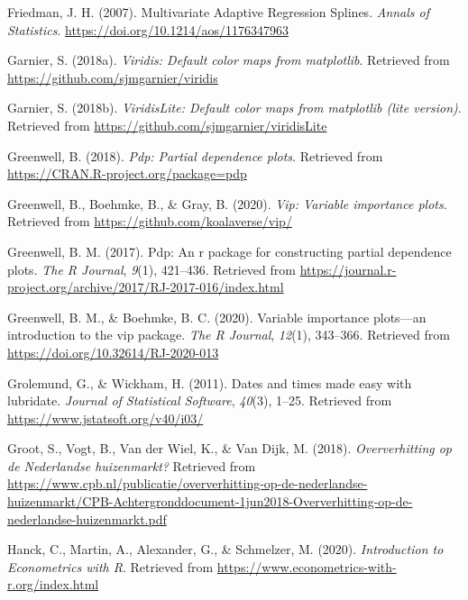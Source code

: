 \documentclass[
]{article}
\begin{document}
\leavevmode\hypertarget{ref-Friedman2007}{}%
Friedman, J. H. (2007). Multivariate Adaptive Regression Splines.
\emph{Annals of Statistics}.
\url{https://doi.org/10.1214/aos/1176347963}

\leavevmode\hypertarget{ref-R-viridis}{}%
Garnier, S. (2018a). \emph{Viridis: Default color maps from matplotlib}.
Retrieved from \url{https://github.com/sjmgarnier/viridis}

\leavevmode\hypertarget{ref-R-viridisLite}{}%
Garnier, S. (2018b). \emph{ViridisLite: Default color maps from
matplotlib (lite version)}. Retrieved from
\url{https://github.com/sjmgarnier/viridisLite}

\leavevmode\hypertarget{ref-R-pdp}{}%
Greenwell, B. (2018). \emph{Pdp: Partial dependence plots}. Retrieved
from \url{https://CRAN.R-project.org/package=pdp}

\leavevmode\hypertarget{ref-R-vip}{}%
Greenwell, B., Boehmke, B., \& Gray, B. (2020). \emph{Vip: Variable
importance plots}. Retrieved from
\url{https://github.com/koalaverse/vip/}

\leavevmode\hypertarget{ref-pdp2017}{}%
Greenwell, B. M. (2017). Pdp: An r package for constructing partial
dependence plots. \emph{The R Journal}, \emph{9}(1), 421--436. Retrieved
from
\url{https://journal.r-project.org/archive/2017/RJ-2017-016/index.html}

\leavevmode\hypertarget{ref-vip2020}{}%
Greenwell, B. M., \& Boehmke, B. C. (2020). Variable importance
plots---an introduction to the vip package. \emph{The R Journal},
\emph{12}(1), 343--366. Retrieved from
\url{https://doi.org/10.32614/RJ-2020-013}

\leavevmode\hypertarget{ref-lubridate2011}{}%
Grolemund, G., \& Wickham, H. (2011). Dates and times made easy with
lubridate. \emph{Journal of Statistical Software}, \emph{40}(3), 1--25.
Retrieved from \url{https://www.jstatsoft.org/v40/i03/}

\leavevmode\hypertarget{ref-Groot2018}{}%
Groot, S., Vogt, B., Van der Wiel, K., \& Van Dijk, M. (2018).
\emph{Oververhitting op de Nederlandse huizenmarkt?} Retrieved from
\url{https://www.cpb.nl/publicatie/oververhitting-op-de-nederlandse-huizenmarkt/CPB-Achtergronddocument-1jun2018-Oververhitting-op-de-nederlandse-huizenmarkt.pdf}

\leavevmode\hypertarget{ref-Hanck2020}{}%
Hanck, C., Martin, A., Alexander, G., \& Schmelzer, M. (2020).
\emph{Introduction to Econometrics with R}. Retrieved from
\url{https://www.econometrics-with-r.org/index.html}
\end{document}
